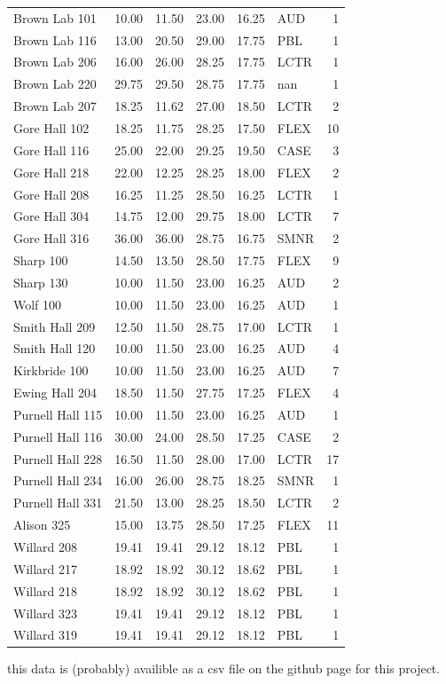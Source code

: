 \documentclass[conference]{IEEEtran}
\begin{document}
\begin{tabular}{lrrrrlr}
    Brown Lab 101 & 10.00 & 11.50 & 23.00 & 16.25 & AUD & 1 \\
    Brown Lab 116 & 13.00 & 20.50 & 29.00 & 17.75 & PBL & 1 \\
    Brown Lab 206 & 16.00 & 26.00 & 28.25 & 17.75 & LCTR & 1 \\
    Brown Lab 220 & 29.75 & 29.50 & 28.75 & 17.75 & nan & 1 \\
    Brown Lab 207 & 18.25 & 11.62 & 27.00 & 18.50 & LCTR & 2 \\
    Gore Hall 102 & 18.25 & 11.75 & 28.25 & 17.50 & FLEX & 10 \\
    Gore Hall 116 & 25.00 & 22.00 & 29.25 & 19.50 & CASE & 3 \\
    Gore Hall 218 & 22.00 & 12.25 & 28.25 & 18.00 & FLEX & 2 \\
    Gore Hall 208 & 16.25 & 11.25 & 28.50 & 16.25 & LCTR & 1 \\
    Gore Hall 304 & 14.75 & 12.00 & 29.75 & 18.00 & LCTR & 7 \\
    Gore Hall 316 & 36.00 & 36.00 & 28.75 & 16.75 & SMNR & 2 \\
    Sharp 100 & 14.50 & 13.50 & 28.50 & 17.75 & FLEX & 9 \\
    Sharp 130 & 10.00 & 11.50 & 23.00 & 16.25 & AUD & 2 \\
    Wolf 100 & 10.00 & 11.50 & 23.00 & 16.25 & AUD & 1 \\
    Smith Hall 209 & 12.50 & 11.50 & 28.75 & 17.00 & LCTR & 1 \\
    Smith Hall 120 & 10.00 & 11.50 & 23.00 & 16.25 & AUD & 4 \\
    Kirkbride 100 & 10.00 & 11.50 & 23.00 & 16.25 & AUD & 7 \\
    Ewing Hall 204 & 18.50 & 11.50 & 27.75 & 17.25 & FLEX & 4 \\
    Purnell Hall 115 & 10.00 & 11.50 & 23.00 & 16.25 & AUD & 1 \\
    Purnell Hall 116 & 30.00 & 24.00 & 28.50 & 17.25 & CASE & 2 \\
    Purnell Hall 228 & 16.50 & 11.50 & 28.00 & 17.00 & LCTR & 17 \\
    Purnell Hall 234 & 16.00 & 26.00 & 28.75 & 18.25 & SMNR & 1 \\
    Purnell Hall 331 & 21.50 & 13.00 & 28.25 & 18.50 & LCTR & 2 \\
    Alison 325 & 15.00 & 13.75 & 28.50 & 17.25 & FLEX & 11 \\
    Willard 208 & 19.41 & 19.41 & 29.12 & 18.12 & PBL & 1 \\
    Willard 217 & 18.92 & 18.92 & 30.12 & 18.62 & PBL & 1 \\
    Willard 218 & 18.92 & 18.92 & 30.12 & 18.62 & PBL & 1 \\
    Willard 323 & 19.41 & 19.41 & 29.12 & 18.12 & PBL & 1 \\
    Willard 319 & 19.41 & 19.41 & 29.12 & 18.12 & PBL & 1 \\
    \bottomrule
    \end{tabular}
    

\vspace{1em}
this data is (probably) availible as a csv file on the github page for this project.
\twocolumn
\clearpage
\end{document}
